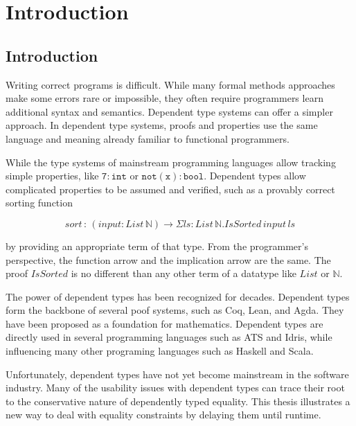 \chapter{Introduction}
\label{chapter:Introduction}
\thispagestyle{myheadings}

\section{Introduction} %

Writing correct programs is difficult.
While many formal methods approaches make some errors rare or impossible, they often require programmers learn additional syntax and semantics.
Dependent type systems can offer a simpler approach.
In dependent type systems, proofs and properties use the same language and meaning already familiar to functional programmers.

While the type systems of mainstream programming languages allow tracking simple properties, like $\mathtt{7:int}$ or $\mathtt{not(x):bool}$.
Dependent types allow complicated properties to be assumed and verified, such as a provably correct sorting function

\[
sort\,:\,\left(input:List\,\mathbb{N}\right)\rightarrow\Sigma ls:List\,\mathbb{N}.IsSorted\,input\,ls
\]

by providing an appropriate term of that type.
From the programmer's perspective, the function arrow and the implication arrow are the same.
The proof $IsSorted$ is no different than any other term of a datatype like $List$ or $\mathbb{N}$.

The power of dependent types has been recognized for decades.
Dependent types form the backbone of several poof systems, such as Coq\cite{Coq12}, Lean\cite{10.1007/978-3-030-79876-5_37}, and Agda\cite{norell2007towards}.
They have been proposed as a foundation for mathematics\cite{Martin-Lof-1972,HoTTbook}.
Dependent types are directly used in several programming languages such as ATS\cite{DependentMLAnapproachtopracticalprogrammingwithdependenttypes} and Idris\cite{brady2013idris}, while influencing many other programing languages such as Haskell and Scala.

Unfortunately, dependent types have not yet become mainstream in the software industry.
Many of the usability issues with dependent types can trace their root to the conservative nature of dependently typed equality.
This thesis illustrates a new way to deal with equality constraints by delaying them until runtime.

